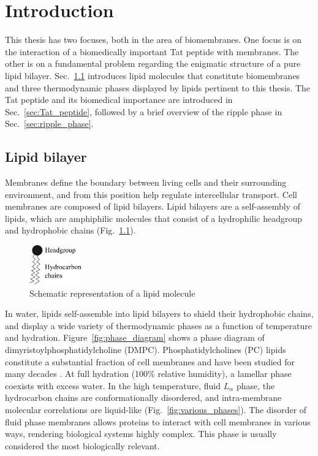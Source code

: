 \chapter{Introduction}
This thesis has two focuses, both in the area of biomembranes.
One focus is on the interaction of a biomedically important Tat peptide with 
membranes.
The other is on a fundamental problem regarding the enigmatic structure of a
pure lipid bilayer.
Sec.~\ref{sec:lipid_bilayer} introduces lipid molecules that constitute
biomembranes and three thermodynamic phases displayed by lipids pertinent to this 
thesis.
The Tat peptide and its biomedical importance are introduced in Sec.~\ref{sec:Tat_peptide},
followed by a brief overview of the ripple phase in Sec.~\ref{sec:ripple_phase}.


\section{Lipid bilayer}\label{sec:lipid_bilayer}
Membranes define the boundary between living cells
and their surrounding environment, and from this position help 
regulate intercellular transport. Cell membranes are composed of lipid bilayers.
Lipid bilayers are a self-assembly of lipids, which are 
amphiphilic molecules that consist of a hydrophilic headgroup
and hydrophobic chains (Fig.~\ref{fig:lipid}).

\begin{figure}
  \centering
  \includegraphics[width=0.2\textwidth]{figures/lipid}
  \caption{Schematic representation of a lipid molecule}
  \label{fig:lipid}
\end{figure}

In water, lipids self-assemble into lipid bilayers to shield their hydrophobic 
chains, and display a wide variety of thermodynamic phases
as a function of temperature and hydration. Figure~\ref{fig:phase_diagram}
shows a phase diagram of dimyristoylphosphatidylcholine (\gls{DMPC}).
Phosphatidylcholines (\gls{PC}) lipids constitute a substantial fraction of cell membranes
and have been studied for many decades \cite{Nagle00}.
At full hydration (100\% relative humidity), a lamellar phase coexists with excess water.
In the high temperature, fluid $L_\alpha$ phase, the hydrocarbon chains 
are conformationally disordered, and intra-membrane molecular correlations 
are liquid-like \cite{ref:Fahey78} (Fig.~\ref{fig:various_phases}).
The disorder of fluid phase membranes allows proteins to 
interact with cell membranes in various ways, rendering biological systems
highly complex. 
This phase is usually considered the most biologically relevant.

